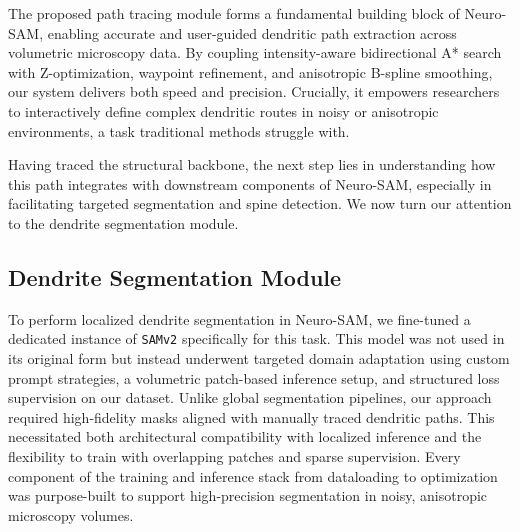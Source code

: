 The proposed path tracing module forms a fundamental building block of Neuro-\gls{SAM}, enabling accurate and user-guided dendritic path extraction across volumetric microscopy data. By coupling intensity-aware bidirectional A* search with Z-optimization, waypoint refinement, and anisotropic B-spline smoothing, our system delivers both speed and precision. Crucially, it empowers researchers to interactively define complex dendritic routes in noisy or anisotropic environments, a task traditional methods struggle with.

Having traced the structural backbone, the next step lies in understanding how this path integrates with downstream components of Neuro-\gls{SAM}, especially in facilitating targeted segmentation and spine detection. We now turn our attention to the dendrite segmentation module.

\subsection{Dendrite Segmentation Module}
To perform localized dendrite segmentation in Neuro-\gls{SAM}, we fine-tuned a dedicated instance of \texttt{\gls{SAMv2}} specifically for this task. This model was not used in its original form but instead underwent targeted domain adaptation using custom prompt strategies, a volumetric patch-based inference setup, and structured loss supervision on our dataset. Unlike global segmentation pipelines, our approach required high-fidelity masks aligned with manually traced dendritic paths. This necessitated both architectural compatibility with localized inference and the flexibility to train with overlapping patches and sparse supervision. Every component of the training and inference stack from dataloading to optimization was purpose-built to support high-precision segmentation in noisy, anisotropic microscopy volumes. 


